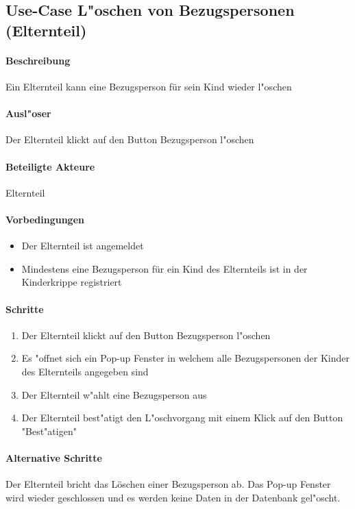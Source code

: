 	
	\newpage
	\subsection{Use-Case L"oschen von Bezugspersonen (Elternteil)}
	\paragraph{Beschreibung}
		Ein Elternteil kann eine Bezugsperson für sein Kind wieder l"oschen
		\paragraph{Ausl"oser}
		Der Elternteil klickt auf den Button \dq Bezugsperson l"oschen\dq
		\paragraph{Beteiligte Akteure}   \leavevmode \newline
		Elternteil
		\paragraph{Vorbedingungen}
		\begin{itemize}
			\item Der Elternteil ist angemeldet
			\item Mindestens eine Bezugsperson für ein Kind des Elternteils ist in der Kinderkrippe registriert
		\end{itemize}
		
		\paragraph{Schritte}
		\begin{enumerate}
			\item Der Elternteil klickt auf den Button \dq Bezugsperson l"oschen\dq
			\item Es "offnet sich ein Pop-up Fenster in welchem alle Bezugspersonen der Kinder des Elternteils angegeben sind
			\item Der Elternteil w"ahlt eine Bezugsperson aus
			\item Der Elternteil best"atigt den L"oschvorgang mit einem Klick auf den Button "Best"atigen"
		\end{enumerate}
		
		\paragraph{Alternative Schritte}
		Der Elternteil bricht das Löschen einer Bezugsperson ab. Das Pop-up Fenster wird wieder geschlossen und es werden keine Daten in der Datenbank gel"oscht. 	
